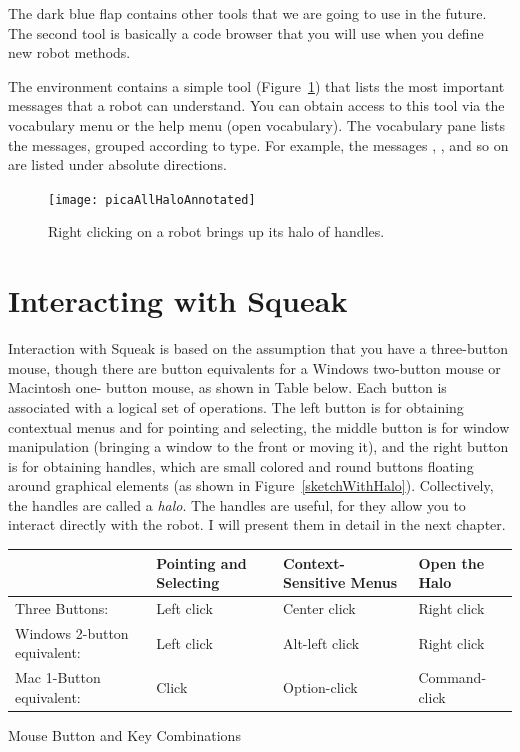\documentclass[a4paper,10pt,twoside]{book}
\begin{document}
The dark blue flap contains other tools that we are going to use in the future. The second 
tool is basically a code browser that you will use when you define new robot methods. 

The environment contains a simple tool (Figure~\ref{fig:rohals}) that lists the most important messages 
that a robot can understand. You can obtain access to this tool via the  vocabulary menu 
or the help menu (open vocabulary). The vocabulary pane lists the messages, grouped according to type. For example, the messages , , and so on are listed under absolute directions.

\begin{figure}[!h]
\begin{center}
\texttt{[image: picaAllHaloAnnotated]}
\caption{Right clicking on a robot brings up its halo of handles.\label{fig:rohals}}
\end{center}
\end{figure}


\section{Interacting with Squeak}

Interaction with Squeak is based on the assumption that you have a three-button mouse, 
though there are button equivalents for a Windows two-button mouse or Macintosh one- 
button mouse, as shown in Table below. Each button is associated with a logical set of operations. 
The left button is for obtaining contextual menus and for pointing and selecting, the middle 
button is for window manipulation (bringing a window to the front or moving it), and the 
right button is for obtaining handles, which are small colored and round buttons floating 
around graphical elements (as shown in Figure~\ref{sketchWithHalo}). Collectively, the handles are called a \emph{halo}. 
The handles are useful, for they allow you to interact directly with the robot. I will present 
them in detail in the next chapter. 

\noindent
\setlength{\extrarowheight}{1mm}
{\small \begin{tabular}{p{22mm}p{25mm}p{25mm}p{25mm}}
\hline
&\textbf{\textsf{Pointing and Selecting}}&\textbf{\textsf{Context-Sensitive Menus}}&\textbf{\textsf{Open the Halo}}\\ \hline
Three Buttons:&Left click&Center click&Right click\\ 
Windows 2-button equivalent: &Left click &Alt-left click&Right click\\ 
Mac 1-Button equivalent:&Click&Option-click&Command-click\\ \hline
\end{tabular}}
Mouse Button and Key Combinations 
\end{document}
